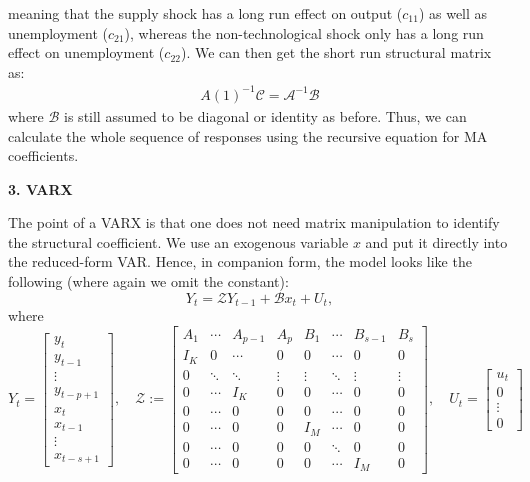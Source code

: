 \documentclass[a4paper, 12pt]{article}
\begin{document}
meaning that the supply shock has a long run effect on output ($c_{11}$) as well as unemployment ($c_{21}$), whereas the non-technological shock only has a long run effect on unemployment ($c_{22}$).
We can then get the short run structural matrix as:
\begin{equation}
\begin{aligned}
A(1)^{-1}\mathcal{C}=\mathcal{A}^{-1}\mathcal{B}\nonumber
\end{aligned}
\end{equation}
where $\mathcal{B}$ is still assumed to be diagonal or identity as before. Thus, we can calculate the whole sequence of responses using the recursive equation for MA coefficients. 
\begin{center}
\textbf{3. VARX}
\end{center} 
\noindent The point of a VARX is that one does not need matrix manipulation to identify the structural coefficient. We use an exogenous variable $x$ and put it directly into the reduced-form VAR. Hence, in companion form, the model looks like the following (where again we omit the constant): 
\[
Y_t = \mathcal{Z} Y_{t-1} + \mathcal{B}x_t + U_t,
\]
\noindent where
\[
Y_t =
\begin{bmatrix}
y_t \\
y_{t-1} \\
\vdots \\
y_{t-p+1} \\
x_t \\
x_{t-1} \\
\vdots \\
x_{t-s+1} 
\end{bmatrix},
\quad
\mathcal{Z} := 
\left[
\begin{array}{cccc|cccc}
A_1 & \cdots & A_{p-1} & A_p & B_1 & \cdots & B_{s-1} & B_s \\
I_K & 0 & \cdots & 0 & 0 & \cdots & 0 & 0 \\
0 & \ddots & \ddots & \vdots & \vdots & \ddots & \vdots & \vdots \\
0 & \cdots & I_K & 0 & 0 & \cdots & 0 & 0 \\ \hline
0 & \cdots & 0 & 0 & 0 & \cdots & 0 & 0 \\
0 & \cdots & 0 & 0 & I_M & \cdots & 0 & 0 \\
0 & \cdots & 0 & 0 & 0 & \ddots & 0 & 0 \\
0 & \cdots & 0 & 0 & 0 & \cdots & I_M & 0
\end{array}
\right],
\quad
U_t =
\begin{bmatrix}
u_t \\
0 \\
\vdots \\
0
\end{bmatrix}
\] 
\end{document}

